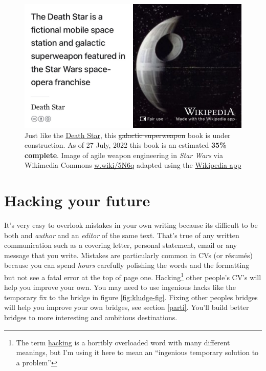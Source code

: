 \documentclass[
]{book}
\begin{document}
\begin{figure}

{\centering \includegraphics[width=0.99\linewidth]{images/DeathStar2} 

}

\caption{Just like the \href{https://en.wikipedia.org/wiki/Death_Star}{Death Star}, this \sout{galactic superweapon} book is under construction. As of 27 July, 2022 this book is an estimated \textbf{35\% complete}. Image of agile weapon engineering in \emph{Star Wars} via Wikimedia Commons \href{https://w.wiki/5N6q}{w.wiki/5N6q} adapted using the \href{https://apps.apple.com/gb/app/wikipedia/id324715238}{Wikipedia app}}\label{fig:deathstar19-fig}
\end{figure}

\hypertarget{hacking}{%
\chapter{Hacking your future}\label{hacking}}

It's very easy to overlook mistakes in your own writing because its difficult to be both and \emph{author} and an \emph{editor} of the same text. That's true of any written communication such as a covering letter, personal statement, email or any message that you write. Mistakes are particularly common in CVs (or résumés) because you can spend \emph{hours} carefully polishing the words and the formatting but not see a fatal error at the top of page one. Hacking\footnote{The term \href{https://en.wikipedia.org/wiki/Hacker_(disambiguation)}{hacking} is a horribly overloaded word with many different meanings, but I'm using it here to mean an ``ingenious temporary solution to a problem''} other people's CV's will help you improve your own. You may need to use ingenious hacks like the temporary fix to the bridge in figure \ref{fig:kludge-fig}. Fixing other peoples bridges will help you improve your own bridges, see section \ref{parti}. You'll build better bridges to more interesting and ambitious destinations.
\end{document}

